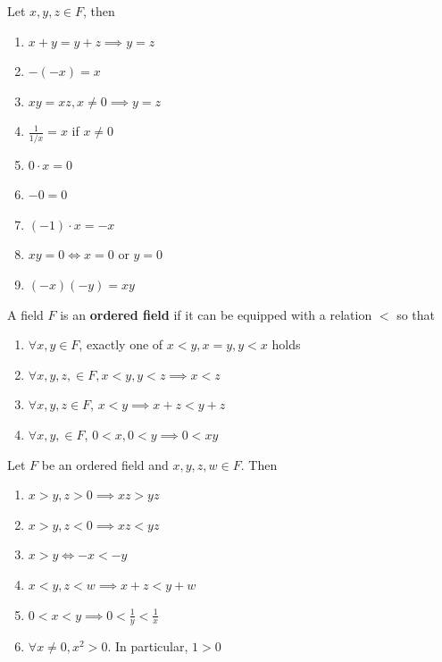 \begin{proposition} Let $x, y, z \in F$, then 
  \begin{enumerate}
    \item $x + y = y + z \implies y = z$
    \item $-(-x) = x$
    \item $x y = xz, x \neq 0 \implies y = z$ 
    \item $ \frac{1}{1 / x} = x$ if $x \neq 0$ 
    \item $0 \cdot x = 0$
    \item $-0 = 0$
    \item $(-1) \cdot x = -x$
    \item $xy = 0 \iff x = 0 \text{ or } y = 0$
    \item $(-x) (-y) = xy$
  \end{enumerate}
\end{proposition}

\begin{definition}
  A field $F$ is an \textbf{ordered field} if it can be equipped with a relation $<$ so that 
  \begin{enumerate}
    \item $\forall x, y \in F$, exactly one of $x < y, x = y, y < x$ holds
    \item $\forall x, y, z, \in F, x < y, y < z \implies x < z$
    \item $\forall x, y, z \in F$, $x < y \implies x + z < y + z$
    \item $\forall x, y, \in F$, $0< x, 0 < y \implies 0 < xy$
  \end{enumerate}
\end{definition}

\begin{proposition}
  Let $F$ be an ordered field and $x, y, z, w \in F$. Then 
  \begin{enumerate}
    \item $x > y, z > 0 \implies xz > yz$
    \item $x > y, z < 0 \implies xz < yz$
    \item $x > y \iff -x < -y$
    \item $x < y, z < w \implies x + z < y + w$
    \item $0 < x < y \implies 0 < \frac{1}{y} < \frac{1}{x}$
    \item $\forall x \neq 0, x^2 > 0$. In particular, $1 > 0$
  \end{enumerate}
\end{proposition}

\newpage